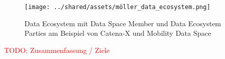 \begin{figure}
    \texttt{[image: ../shared/assets/möller\_data\_ecosystem.png]}
    \caption{Data Ecosystem mit Data Space Member und Data Ecosystem Parties am Beispiel von Catena-X und Mobility Data Space~\cite{mollerIndustrialDataEcosystems2024}}
    \label{fig:data-ecosystem}
\end{figure}

\textcolor{red}{TODO: Zusammenfassung / Ziele}
